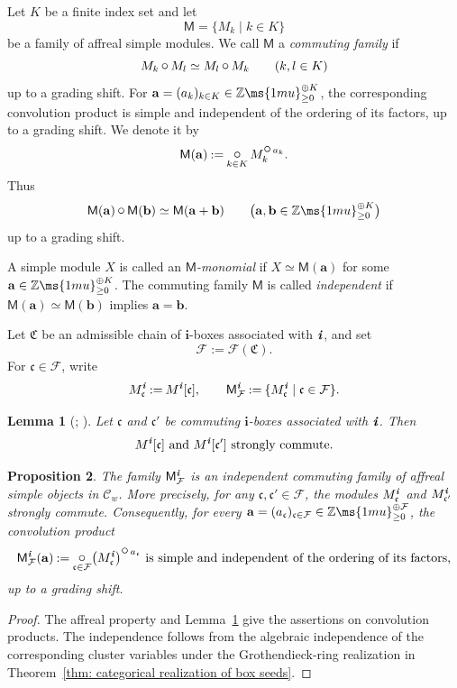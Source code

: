 \documentclass[12pt, leqno]{amsart}
\numberwithin{equation}{section}
\theoremstyle{plain}
\newtheorem{lemma}{Lemma}[section]
\newtheorem{proposition}[lemma]{Proposition}
\theoremstyle{definition}
\newcommand{\seteq}{\mathbin{:=}}
\newcommand{\conv}{\mathop{\mathbin{\mbox{\large $\circ$}}}}
\newcommand{\Z}{\mathbb{Z}\ms{1mu}}
\newcommand{\ii}{ \textbf{\textit{i}}}
\newcommand{\frakC}{\mathfrak{C}}
\newcommand{\frakc}{\mathfrak{c}}
\newcommand{\sfM}{\mathsf{M}}
\newcommand{\bfa}{\mathbf{a}}
\newcommand{\bfb}{\mathbf{b}}
\newcommand{\bfi}{\mathbf{i}}
\newcommand{\calF}{\mathcal{F}}
\newcommand{\scrC}{\mathscr{C}}
\begin{document}
Let \(K\) be a finite index set and let
\[
\sfM=\{M_k\mid k\in K\}
\]
be a family of affreal simple modules.  We call \(\sfM\) a
\emph{commuting family} if
\[
M_k\conv M_l\simeq M_l\conv M_k
\qquad(k,l\in K)
\]
up to a grading shift.  For
\(\bfa=(a_k)_{k\in K}\in\Z_{\geq0}^{\oplus K}\), the corresponding
convolution product is simple and independent of the ordering of its
factors, up to a grading shift.  We denote it by
\[
\sfM(\bfa)
\seteq
\mathop{\conv}_{k\in K}M_k^{\conv a_k}.
\]
Thus
\[
\sfM(\bfa)\conv\sfM(\bfb)
\simeq
\sfM(\bfa+\bfb)
\qquad
\bigl(\bfa,\bfb\in\Z_{\geq0}^{\oplus K}\bigr)
\]
up to a grading shift.

A simple module \(X\) is called an \emph{\(\sfM\)-monomial} if
\(X\simeq\sfM(\bfa)\) for some
\(\bfa\in\Z_{\geq0}^{\oplus K}\).  The commuting family \(\sfM\)
is called \emph{independent} if
\(\sfM(\bfa)\simeq\sfM(\bfb)\) implies \(\bfa=\bfb\). 

\smallskip

Let \(\frakC\) be an admissible chain of \(\bfi\)-boxes associated
with \(\ii\), and set
\[
\calF\seteq\calF(\frakC).
\]
For \(\frakc\in\calF\), write
\[
M_\frakc^\ii\seteq M^\ii[\frakc],
\qquad
\sfM^\ii_\calF
\seteq
\{M_\frakc^\ii\mid\frakc\in\calF\}.
\]

\begin{lemma}[{\cite[Theorem~4.21(b)]{KKOP24A};
\cite[Proposition~5.1]{KK24}}]
\label{lem: commuting box modules}
Let \(\frakc\) and \(\frakc'\) be commuting \(\bfi\)-boxes associated
with \(\ii\).  Then
\[
M^\ii[\frakc] \text{ and } M^\ii[\frakc'] \text{ strongly commute.}
\]
\end{lemma}

\begin{proposition}\label{prop: categorical box family}
The family \(\sfM^\ii_\calF\) is an independent commuting family of
affreal simple objects in \(\scrC_w\).  More precisely, for any
\(\frakc,\frakc'\in\calF\), the modules $M_\frakc^\ii$ and $M_{\frakc'}^\ii$ 
strongly commute.  Consequently, for every
$\bfa=(a_\frakc)_{\frakc\in\calF}
\in\Z_{\geq0}^{\oplus\calF}$,
the convolution product
\[
\sfM^\ii_\calF(\bfa)
\seteq
\mathop{\conv}_{\frakc\in\calF}
\bigl(M_\frakc^\ii\bigr)^{\conv a_\frakc} \text{ is simple and independent of the ordering of its factors,}
\]
up to a grading shift.
\end{proposition}

\begin{proof}
The affreal property and
Lemma~\ref{lem: commuting box modules}
give the assertions on convolution products.
The independence follows from the algebraic independence of
the corresponding cluster variables under the
Grothendieck-ring realization in
Theorem~\ref{thm: categorical realization of box seeds}.
\end{proof}
\end{document}
